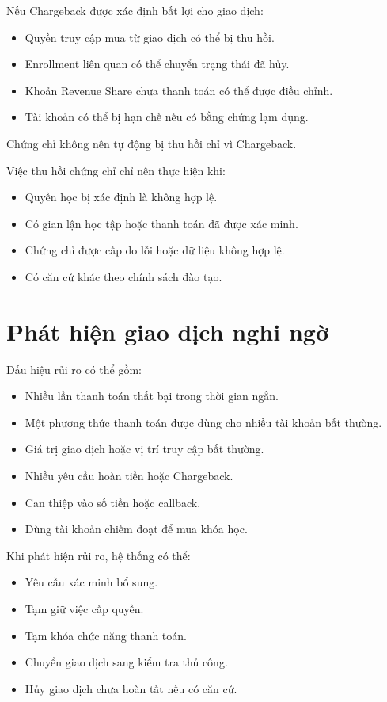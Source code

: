 \documentclass[12pt,a4paper]{article}
\begin{document}
Nếu Chargeback được xác định bất lợi cho giao dịch:

\begin{itemize}
    \item Quyền truy cập mua từ giao dịch có thể bị thu hồi.
    \item Enrollment liên quan có thể chuyển trạng thái đã hủy.
    \item Khoản Revenue Share chưa thanh toán có thể được điều chỉnh.
    \item Tài khoản có thể bị hạn chế nếu có bằng chứng lạm dụng.
\end{itemize}

Chứng chỉ không nên tự động bị thu hồi chỉ vì Chargeback.

Việc thu hồi chứng chỉ chỉ nên thực hiện khi:

\begin{itemize}
    \item Quyền học bị xác định là không hợp lệ.
    \item Có gian lận học tập hoặc thanh toán đã được xác minh.
    \item Chứng chỉ được cấp do lỗi hoặc dữ liệu không hợp lệ.
    \item Có căn cứ khác theo chính sách đào tạo.
\end{itemize}

\section{Phát hiện giao dịch nghi ngờ}

Dấu hiệu rủi ro có thể gồm:

\begin{itemize}
    \item Nhiều lần thanh toán thất bại trong thời gian ngắn.
    \item Một phương thức thanh toán được dùng cho nhiều tài khoản bất thường.
    \item Giá trị giao dịch hoặc vị trí truy cập bất thường.
    \item Nhiều yêu cầu hoàn tiền hoặc Chargeback.
    \item Can thiệp vào số tiền hoặc callback.
    \item Dùng tài khoản chiếm đoạt để mua khóa học.
\end{itemize}

Khi phát hiện rủi ro, hệ thống có thể:

\begin{itemize}
    \item Yêu cầu xác minh bổ sung.
    \item Tạm giữ việc cấp quyền.
    \item Tạm khóa chức năng thanh toán.
    \item Chuyển giao dịch sang kiểm tra thủ công.
    \item Hủy giao dịch chưa hoàn tất nếu có căn cứ.
\end{itemize}
\end{document}
